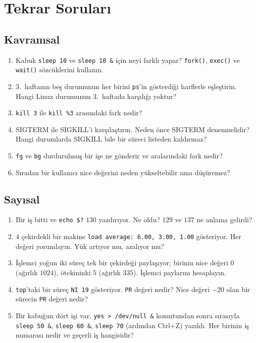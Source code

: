 \documentclass[11pt,a4paper]{article}
\newcommand{\cmd}[1]{\texttt{#1}}
\begin{document}
\section{Tekrar Soruları}

\subsection*{Kavramsal}
\begin{enumerate}[leftmargin=1.6em]
  \item Kabuk \cmd{sleep 10} ve \cmd{sleep 10 \&} için neyi farklı yapar? \cmd{fork()}, \cmd{exec()} ve \cmd{wait()} sözcüklerini kullanın.
  \item 3.~haftanın beş durumunun her birini \cmd{ps}'in gösterdiği harflerle eşleştirin. Hangi Linux durumunun 3.~haftada karşılığı yoktur?
  \item \cmd{kill 3} ile \cmd{kill \%3} arasındaki fark nedir?
  \item SIGTERM ile SIGKILL'i karşılaştırın. Neden önce SIGTERM denenmelidir? Hangi durumlarda SIGKILL bile bir süreci listeden kaldırmaz?
  \item \cmd{fg} ve \cmd{bg} durdurulmuş bir işe ne gönderir ve aralarındaki fark nedir?
  \item Sıradan bir kullanıcı nice değerini neden yükseltebilir ama düşüremez?
\end{enumerate}

\subsection*{Sayısal}
\begin{enumerate}[leftmargin=1.6em,resume]
  \item Bir iş bitti ve \verb|echo $?| $130$ yazdırıyor. Ne oldu? $129$ ve $137$ ne anlama gelirdi?
  \item $4$ çekirdekli bir makine \texttt{load average: 6.00, 3.00, 1.00} gösteriyor. Her değeri yorumlayın. Yük artıyor mu, azalıyor mu?
  \item İşlemci yoğun iki süreç tek bir çekirdeği paylaşıyor; birinin nice değeri $0$ (ağırlık $1024$), ötekininki $5$ (ağırlık $335$). İşlemci paylarını hesaplayın.
  \item \cmd{top}'taki bir süreç \texttt{NI 19} gösteriyor. \texttt{PR} değeri nedir? Nice değeri $-20$ olan bir sürecin \texttt{PR} değeri nedir?
  \item Bir kabuğun dört işi var. \cmd{yes > /dev/null \&} komutundan sonra sırasıyla \cmd{sleep 50 \&}, \cmd{sleep 60 \&}, \cmd{sleep 70} (ardından Ctrl+Z) yazıldı. Her birinin iş numarası nedir ve geçerli iş hangisidir?
\end{enumerate}
\end{document}

